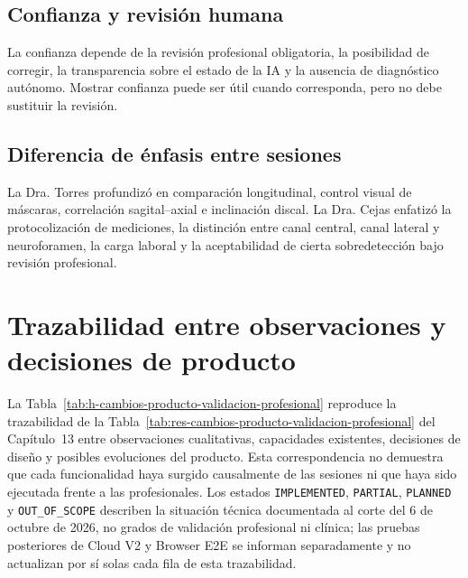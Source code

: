 \subsection*{Confianza y revisión humana}
La confianza depende de la revisión profesional obligatoria, la posibilidad de corregir, la transparencia sobre el estado de la IA y la ausencia de diagnóstico autónomo. Mostrar confianza puede ser útil cuando corresponda, pero no debe sustituir la revisión.

\subsection*{Diferencia de énfasis entre sesiones}
La Dra. Torres profundizó en comparación longitudinal, control visual de máscaras, correlación sagital--axial e inclinación discal. La Dra. Cejas enfatizó la protocolización de mediciones, la distinción entre canal central, canal lateral y neuroforamen, la carga laboral y la aceptabilidad de cierta sobredetección bajo revisión profesional.

\section{Trazabilidad entre observaciones y decisiones de producto}
\label{anexo:h-trazabilidad}

La Tabla~\ref{tab:h-cambios-producto-validacion-profesional} reproduce la trazabilidad de la Tabla~\ref{tab:res-cambios-producto-validacion-profesional} del Capítulo~13 entre observaciones cualitativas, capacidades existentes, decisiones de diseño y posibles evoluciones del producto. Esta correspondencia no demuestra que cada funcionalidad haya surgido causalmente de las sesiones ni que haya sido ejecutada frente a las profesionales. Los estados \texttt{IMPLEMENTED}, \texttt{PARTIAL}, \texttt{PLANNED} y \texttt{OUT\_OF\_SCOPE} describen la situación técnica documentada al corte del 6 de octubre de 2026, no grados de validación profesional ni clínica; las pruebas posteriores de Cloud V2 y Browser E2E se informan separadamente y no actualizan por sí solas cada fila de esta trazabilidad.

